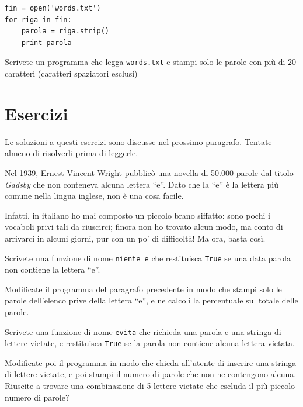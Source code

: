\documentclass[10pt]{book}
\begin{document}
\begin{verbatim}
fin = open('words.txt')
for riga in fin:
    parola = riga.strip()
    print parola
\end{verbatim}
%

\vspace{0.2in}
\begin{exercise}

Scrivete un programma che legga {\tt words.txt} e stampi solo le parole con più di 20 caratteri (caratteri spaziatori esclusi)

\end{exercise}


\section{Esercizi}

Le soluzioni a questi esercizi sono discusse nel prossimo paragrafo. Tentate almeno di risolverli prima di leggerle.

\vspace{0.2in}
\begin{exercise}

Nel 1939, Ernest Vincent Wright pubblicò una novella di 50.000 parole dal titolo
{\em Gadsby} che non conteneva alcuna lettera ``e''.  Dato che la ``e'' è la lettera più comune nella lingua inglese, non è una cosa facile.

Infatti, in italiano ho mai composto un piccolo brano siffatto: sono pochi i vocaboli privi tali da riuscirci; finora non ho trovato alcun modo, ma conto di arrivarci in alcuni giorni, pur con un po' di difficoltà! Ma ora, basta così.

Scrivete una funzione di nome \verb"niente_e" che restituisca {\tt True} se una data parola non contiene la lettera ``e''.

Modificate il programma del paragrafo precedente in modo che stampi solo le parole dell'elenco prive della lettera ``e'', e ne calcoli la percentuale sul totale delle parole.

\end{exercise}

\vspace{0.2in}
\begin{exercise} 

Scrivete una funzione di nome {\tt evita} che richieda una parola e una stringa di lettere vietate, e restituisca {\tt True} se la parola non contiene alcuna lettera vietata.

Modificate poi il programma in modo che chieda all'utente di inserire una stringa di lettere vietate, e poi stampi il numero di parole che non ne contengono alcuna. Riuscite a trovare una combinazione di 5 lettere vietate che escluda il più piccolo numero di parole?

\end{exercise}
\end{document}
